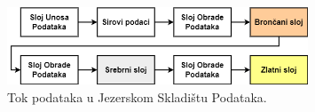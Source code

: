 \begin{figure}
    \centering
    \includegraphics[width=0.8\textwidth]{images/tok_podataka.drawio.png}
    \caption{Tok podataka u Jezerskom Skladištu Podataka.}
    \label{fig:datalakehouse_data_flow}
\end{figure}